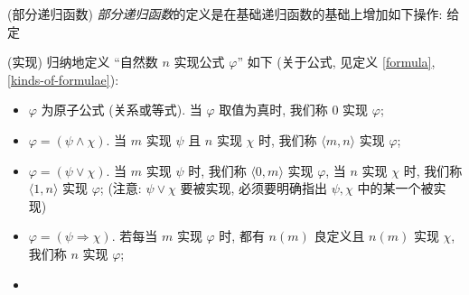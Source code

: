\begin{definition}
	{(部分递归函数)}
	\emph{部分递归函数}的定义是在基础递归函数的基础上增加如下操作: 给定
\end{definition}


\begin{definition}
	{(实现)}
	归纳地定义 ``自然数 $n$ 实现公式 $\varphi$'' 如下 (关于公式, 见定义 \ref{formula}, \ref{kinds-of-formulae}):
	\begin{itemize}
		\item $\varphi$ 为原子公式 (关系或等式). 当 $\varphi$ 取值为真时, 我们称 $0$ 实现 $\varphi$;
		\item $\varphi = (\psi \land \chi)$. 当 $m$ 实现 $\psi$ 且 $n$ 实现 $\chi$ 时, 我们称 $\langle m,n\rangle$ 实现 $\varphi$;
		\item $\varphi = (\psi \lor \chi)$. 当 $m$ 实现 $\psi$ 时, 我们称 $\langle 0,m\rangle$ 实现 $\varphi$, 当 $n$ 实现 $\chi$ 时, 我们称 $\langle 1,n\rangle$ 实现 $\varphi$; (注意: $\psi\lor\chi$ 要被实现, 必须要明确指出 $\psi,\chi$ 中的某一个被实现)
		\item $\varphi = (\psi \Rightarrow \chi)$. 若每当 $m$ 实现 $\varphi$ 时, 都有 $n(m)$ 良定义且 $n(m)$ 实现 $\chi$, 我们称 $n$ 实现 $\varphi$;
		\item 
	\end{itemize}
\end{definition}